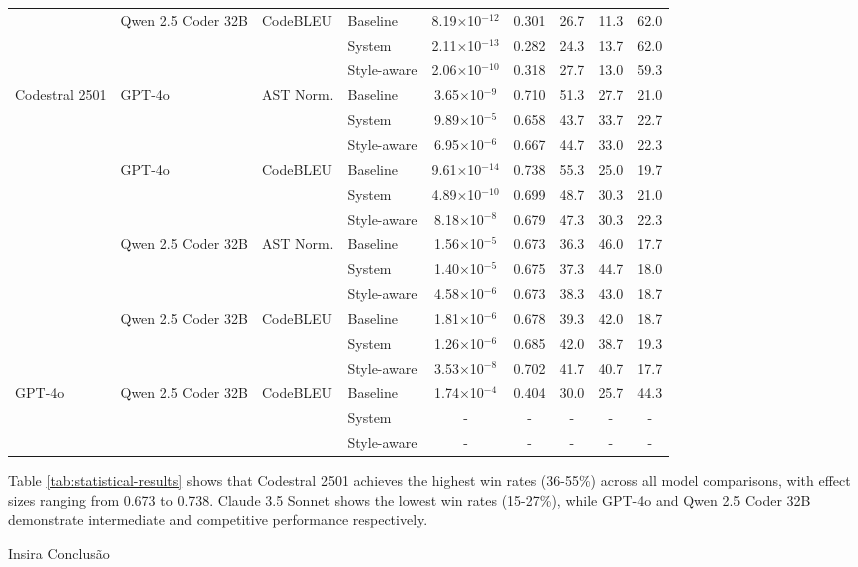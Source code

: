 \begin{table}[h!]
{\begin{tabular}{|l|l|l|l|c|c|c|c|c|}
\cline{2-9}
& \multirow{2}{*}{Qwen 2.5 Coder 32B} & \multirow{2}{*}{CodeBLEU} & Baseline & 8.19$\times$10$^{-12}$ & 0.301 & 26.7 & 11.3 & 62.0 \\
\cline{4-9}
& & & System & 2.11$\times$10$^{-13}$ & 0.282 & 24.3 & 13.7 & 62.0 \\
\cline{4-9}
& & & Style-aware & 2.06$\times$10$^{-10}$ & 0.318 & 27.7 & 13.0 & 59.3 \\
\hline
\multirow{6}{*}{Codestral 2501} & \multirow{2}{*}{GPT-4o} & \multirow{2}{*}{AST Norm.} & Baseline & 3.65$\times$10$^{-9}$ & 0.710 & 51.3 & 27.7 & 21.0 \\
\cline{4-9}
& & & System & 9.89$\times$10$^{-5}$ & 0.658 & 43.7 & 33.7 & 22.7 \\
\cline{4-9}
& & & Style-aware & 6.95$\times$10$^{-6}$ & 0.667 & 44.7 & 33.0 & 22.3 \\
\cline{2-9}
& \multirow{2}{*}{GPT-4o} & \multirow{2}{*}{CodeBLEU} & Baseline & 9.61$\times$10$^{-14}$ & 0.738 & 55.3 & 25.0 & 19.7 \\
\cline{4-9}
& & & System & 4.89$\times$10$^{-10}$ & 0.699 & 48.7 & 30.3 & 21.0 \\
\cline{4-9}
& & & Style-aware & 8.18$\times$10$^{-8}$ & 0.679 & 47.3 & 30.3 & 22.3 \\
\cline{2-9}
& \multirow{2}{*}{Qwen 2.5 Coder 32B} & \multirow{2}{*}{AST Norm.} & Baseline & 1.56$\times$10$^{-5}$ & 0.673 & 36.3 & 46.0 & 17.7 \\
\cline{4-9}
& & & System & 1.40$\times$10$^{-5}$ & 0.675 & 37.3 & 44.7 & 18.0 \\
\cline{4-9}
& & & Style-aware & 4.58$\times$10$^{-6}$ & 0.673 & 38.3 & 43.0 & 18.7 \\
\cline{2-9}
& \multirow{2}{*}{Qwen 2.5 Coder 32B} & \multirow{2}{*}{CodeBLEU} & Baseline & 1.81$\times$10$^{-6}$ & 0.678 & 39.3 & 42.0 & 18.7 \\
\cline{4-9}
& & & System & 1.26$\times$10$^{-6}$ & 0.685 & 42.0 & 38.7 & 19.3 \\
\cline{4-9}
& & & Style-aware & 3.53$\times$10$^{-8}$ & 0.702 & 41.7 & 40.7 & 17.7 \\
\hline
\multirow{2}{*}{GPT-4o} & \multirow{2}{*}{Qwen 2.5 Coder 32B} & \multirow{2}{*}{CodeBLEU} & Baseline & 1.74$\times$10$^{-4}$ & 0.404 & 30.0 & 25.7 & 44.3 \\
\cline{4-9}
& & & System & - & - & - & - & - \\
\cline{4-9}
& & & Style-aware & - & - & - & - & - \\
\hline
\end{tabular}%
}
\end{table}

Table \ref{tab:statistical-results} shows that Codestral 2501 achieves the highest win rates (36-55\%) across all model comparisons, with effect sizes ranging from 0.673 to 0.738. Claude 3.5 Sonnet shows the lowest win rates (15-27\%), while GPT-4o and Qwen 2.5 Coder 32B demonstrate intermediate and competitive performance respectively.



Insira Conclusão
